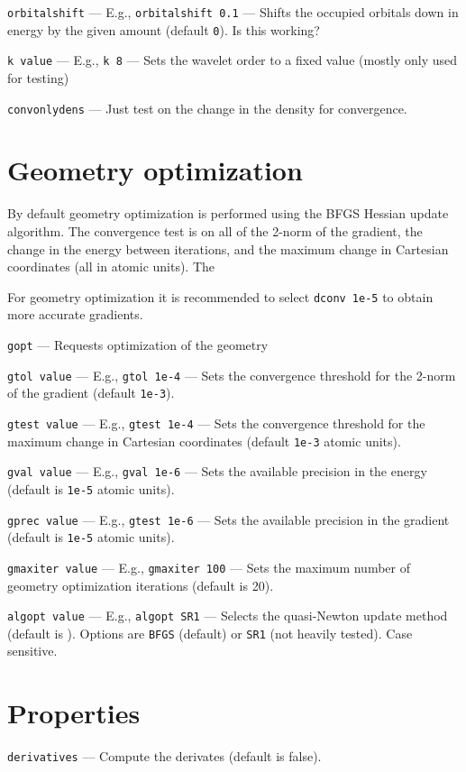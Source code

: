 \documentclass[letterpaper]{book}
\begin{document}
{\tt orbitalshift} --- E.g., {\tt orbitalshift 0.1} --- Shifts the occupied orbitals down in energy by the given amount (default {\tt 0}).  Is this working?

{\tt k value} --- E.g., {\tt k 8} --- Sets the wavelet order to a fixed value (mostly only used for testing)

{\tt convonlydens} --- Just test on the change in the density for convergence.


\section{Geometry optimization}

By default geometry optimization is performed using the BFGS Hessian update algorithm.  The convergence test is on all of the 2-norm of the gradient, the change in the energy between iterations, and the maximum change in Cartesian coordinates (all in atomic units).  The 

For geometry optimization it is recommended to select {\tt dconv 1e-5} to obtain more accurate gradients.

{\tt gopt} --- Requests optimization of the geometry

{\tt gtol value} --- E.g., {\tt gtol 1e-4} --- Sets the convergence threshold for the 2-norm of the gradient (default {\tt 1e-3}).

{\tt gtest value} --- E.g., {\tt gtest 1e-4} --- Sets the convergence threshold for the maximum change in Cartesian coordinates (default {\tt 1e-3} atomic units).

{\tt gval value} --- E.g., {\tt gval 1e-6} --- Sets the available precision in the energy (default is {\tt 1e-5} atomic units).

{\tt gprec value} --- E.g., {\tt gtest 1e-6} --- Sets the available precision in the gradient (default is {\tt 1e-5} atomic units).

{\tt gmaxiter value} --- E.g., {\tt gmaxiter 100} --- Sets the maximum number of geometry optimization iterations (default is 20).

{\tt algopt value} --- E.g., {\tt algopt SR1} --- Selects the quasi-Newton update method (default is ).  Options are {\tt BFGS} (default) or {\tt SR1} (not heavily tested).  Case sensitive.

\section{Properties}

{\tt derivatives} --- Compute the derivates (default is false).
\end{document}
